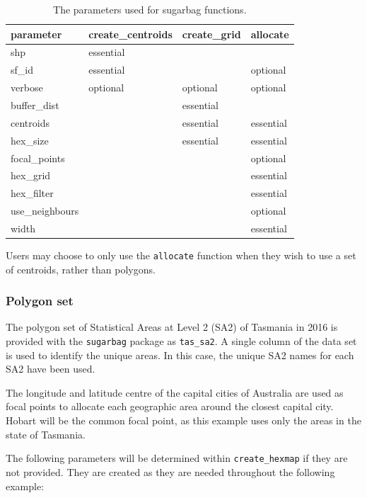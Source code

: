 \documentclass{monashthesis}
\begin{document}
\begin{table}[!h]

\caption{\label{tab:parameters}The parameters used for sugarbag functions.}
\centering
\begin{tabular}[t]{llll}
\toprule
parameter & create\_centroids & create\_grid & allocate\\
\midrule
shp & essential &  & \\
sf\_id & essential &  & optional\\
\addlinespace
verbose & optional & optional & optional\\
buffer\_dist &  & essential & \\
\addlinespace
centroids &  & essential & essential\\
hex\_size &  & essential & essential\\
focal\_points &  &  & optional\\
\addlinespace
hex\_grid &  &  & essential\\
hex\_filter &  &  & essential\\
\addlinespace
use\_neighbours &  &  & optional\\
width &  &  & essential\\
\bottomrule
\end{tabular}
\end{table}

Users may choose to only use the \texttt{allocate} function when they wish to use a set of centroids, rather than \autocite{sf} polygons.

\hypertarget{polygon-set}{%
\subsubsection{Polygon set}\label{polygon-set}}

The polygon set of Statistical Areas at Level 2 (SA2) \autocite{abs2016} of Tasmania in 2016 is provided with the \texttt{sugarbag} package as \texttt{tas\_sa2}.
A single column of the data set is used to identify the unique areas.
In this case, the unique SA2 names for each SA2 have been used.

The longitude and latitude centre of the capital cities of Australia are used as focal points to allocate each geographic area around the closest capital city. Hobart will be the common focal point, as this example uses only the areas in the state of Tasmania.

The following parameters will be determined within \texttt{create\_hexmap} if they are not provided. They are created as they are needed throughout the following example:
\end{document}
